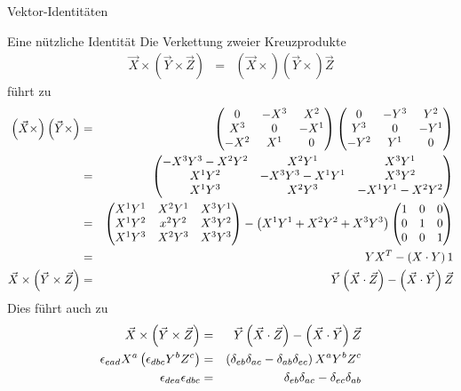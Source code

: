 \begin{chapter}{\titlestr}
\begin{appendix}
\begin{section}{Vektor-Identitäten}
\begin{subsection}{Eine nützliche Identität}
Die Verkettung zweier Kreuzprodukte
\begin{eqnarray*}
\vec{X}\times\left(\vec{Y}\times \vec{Z}\right) &=&\left(\vec{X}\times\right)\left(\vec{Y}\times\right)\vec{Z}
\end{eqnarray*}
führt zu
\begin{eqnarray}
\left(\vec{X}\times\right)\left(\vec{Y}\times\right) &=& 
\begin{pmatrix}
0 & -X^3 & X^2\\
X^3 & 0 & -X^1\\
-X^2 & X^1 & 0
\end{pmatrix}
\begin{pmatrix}
0 & -Y^3 & Y^2\\
Y^3 & 0 & -Y^1\\
-Y^2 & Y^1 & 0
\end{pmatrix}\cr
&=&
\begin{pmatrix}
-X^3Y^3-X^2Y^2 & X^2Y^1 & X^3Y^1\\
X^1Y^2 & -X^3Y^3-X^1Y^1 & X^3Y^2\\
X^1Y^3 & X^2Y^3 & -X^1Y^1-X^2Y^2
\end{pmatrix}\cr
&=&
\begin{pmatrix}
X^1Y^1 & X^2Y^1 & X^3Y^1\\
X^1Y^2 & x^2Y^2 & X^3Y^2\\
X^1Y^3 & X^2Y^3 & X^3Y^3
\end{pmatrix}
-\left(X^1Y^1+X^2Y^2+X^3Y^3\right)
\begin{pmatrix}
1 & 0 & 0\\
0 & 1 & 0\\
0 & 0 & 1
\end{pmatrix}\cr
\label{b_cross_b_cross}
&=&YX^T-\left(X\cdot Y\right)1\\
\vec{X}\times\left(\vec{Y}\times \vec{Z}\right) &=&
\vec{Y}\left(\vec{X}\cdot \vec{Z}\right)-\left(\vec{X}\cdot\vec{Y}\right)\vec{Z}
\end{eqnarray}
Dies führt auch zu
\begin{eqnarray}
\vec{X}\times\left(\vec{Y}\times \vec{Z}\right) &=&
\vec{Y}\left(\vec{X}\cdot \vec{Z}\right)-\left(\vec{X}\cdot\vec{Y}\right)\vec{Z}\cr
\epsilon_{ead}X^a\left(\epsilon_{dbc}Y^bZ^c\right) &=&
\left(\delta_{eb}\delta_{ac}-\delta_{ab}\delta_{ec}\right)X^aY^bZ^c\cr
\epsilon_{dea}\epsilon_{dbc} &=& \delta_{eb}\delta_{ac}-\delta_{ec}\delta_{ab}
\end{eqnarray}
\end{subsection}
\end{section}


\ifx\makebook\undefined
\end{appendix}
	
\else
	\end{chapter}
\fi
